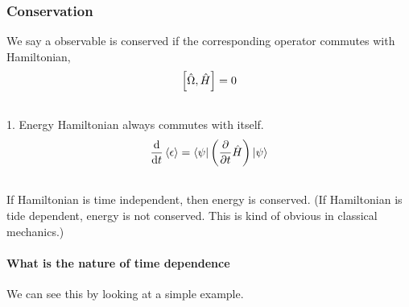 \documentclass[letterpaper,10pt,english]{sphinxmanual}
\begin{document}
\subsubsection{Conservation}
\label{QuantumMechanics:conservation}
We say a observable is conserved if the corresponding operator commutes with Hamiltonian,
\begin{gather}
\begin{split}\left[ \hat \Omega, \hat H \right]=0\end{split}\notag\\\begin{split}\end{split}\notag
\end{gather}
1. Energy
Hamiltonian always commutes with itself.
\begin{gather}
\begin{split}\frac{\mathrm{d}}{\mathrm{d} t} \left<\epsilon \right> = \left\langle \psi\right| \left( \frac{\partial }{\partial t} \hat H \right) \left| \psi\right\rangle\end{split}\notag\\\begin{split}\end{split}\notag
\end{gather}
If Hamiltonian is time independent, then energy is conserved. (If Hamiltonian is tide dependent, energy is not conserved. This is kind of obvious in classical mechanics.)


\paragraph{What is the nature of time dependence}
\label{QuantumMechanics:what-is-the-nature-of-time-dependence}
We can see this by looking at a simple example.
\end{document}
